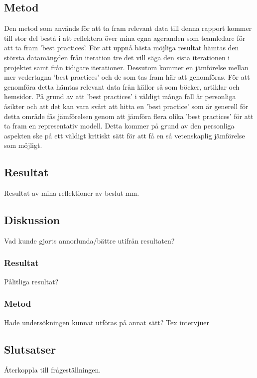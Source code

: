\subsection{Metod}
Den metod som används för att ta fram relevant data till denna rapport kommer till stor del bestå i att reflektera över mina egna ageranden som teamledare för att ta fram 'best practices'. För att uppnå bästa möjliga resultat hämtas den största datamängden från iteration tre det vill säga den sista iterationen i projektet samt från tidigare iterationer. Dessutom kommer en jämförelse mellan mer vedertagna 'best practices' och de som tas fram här att genomföras. För att genomföra detta hämtas relevant data från källor så som böcker, artiklar och hemsidor. På grund av att 'best practices' i väldigt många fall är personliga åsikter och att det kan vara svårt att hitta en 'best practice' som är generell för detta område fås jämförelsen genom att jämföra flera olika 'best practices' för att ta fram en representativ modell. Detta kommer på grund av den personliga aspekten ske på ett väldigt kritiskt sätt för att få en så vetenskaplig jämförelse som möjligt.

\subsection{Resultat}
Resultat av mina reflektioner av beslut mm.

\subsection{Diskussion}
Vad kunde gjorts annorlunda/bättre utifrån resultaten?

\subsubsection{Resultat}
Pålitliga resultat? 

\subsubsection{Metod}
Hade undersökningen kunnat utföras på annat sätt?
\newline
Tex intervjuer

\subsection{Slutsatser}
Återkoppla till frågeställningen.
